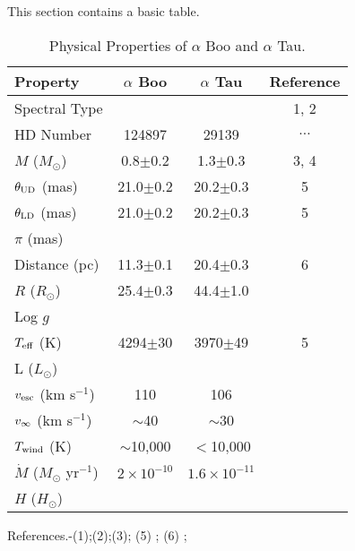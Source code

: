 This section contains a basic table.


\begin{table}
\begin{center}
\caption[Physical Properties of $\alpha$ Boo and $\alpha$ Tau.]
{Physical Properties of $\alpha$ Boo and $\alpha$ Tau.}
\begin{tabular}{lccc}
\hline
\hline
Property & $\alpha$ Boo & $\alpha$ Tau & Reference\\
\hline
Spectral Type & & & 1, 2\\ 
HD Number & 124897 & 29139 & $\ldots$\\
$M$ ($M_{\odot}$) & 0.8$\pm$0.2 & 1.3$\pm$0.3& 3, 4 \\
$\theta _{\rm{UD}}$ (mas)& 21.0$\pm$0.2 & 20.2$\pm$0.3& 5 \\
$\theta _{\rm{LD}}$ (mas)& 21.0$\pm$0.2 & 20.2$\pm$0.3& 5 \\
$\pi$ (mas)& & & \\
Distance (pc)& 11.3$\pm$0.1 & 20.4$\pm$0.3& 6\\
$R$ ($R_{\odot}$)& 25.4$\pm$0.3 & 44.4$\pm$1.0 & \\
Log $g$ & & & \\
$T_{\rm{eff}}$ (K) & 4294$\pm$30 & 3970$\pm$49& 5 \\
L ($L_{\odot}$)& & & \\
$v_{\rm{esc}}$ (km s$^{-1}$) &110 & 106& \\
$v_{\rm{\infty}}$ (km s$^{-1}$)& $\sim$40 & $\sim$30& \\
$T_{\rm{wind}}$ (K)& $\sim$10,000 & $<$10,000 & \\
$\dot{M}$ ($M_{\odot}$ yr$^{-1}$)& $2\times 10^{-10}$& $1.6\times 10^{-11}$& \\
$H$ ($H_{\odot}$)& & & \\
\hline
\end{tabular}
\label{tab:1}
\begin{minipage}{9.5cm}
References.-(1);(2);(3)\cite{kallinger_2010}; (5) \cite{di_benedetto_1993};
(6) \cite{van_leeuwen_2007};
\end{minipage}
\end{center}
\end{table}

